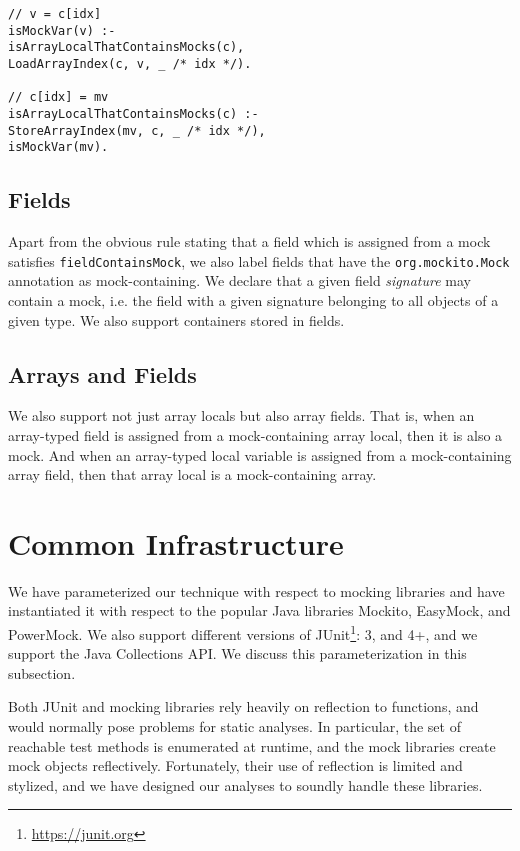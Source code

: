 \begin{lstlisting}[basicstyle=\ttfamily\small,numbers=none]
// v = c[idx]
isMockVar(v) :-
isArrayLocalThatContainsMocks(c),
LoadArrayIndex(c, v, _ /* idx */).

// c[idx] = mv
isArrayLocalThatContainsMocks(c) :-
StoreArrayIndex(mv, c, _ /* idx */),
isMockVar(mv).
\end{lstlisting}

\subsection{Fields} 

Apart from the obvious rule stating that a field which is assigned from a mock satisfies {\tt fieldContainsMock}, we also label fields that have the {\tt org.mockito.Mock} annotation as mock-containing. We declare that a given field \emph{signature} may contain a mock, i.e. the field with a given signature belonging to all objects of a given type. We also support containers stored in fields.

\subsection{Arrays and Fields} 

We also support not just array locals but also array fields. That is, when an array-typed field is assigned from a mock-containing array local, then it is also a mock. And when an array-typed local variable is assigned from a mock-containing array field, then that array local is a mock-containing array.

\section{Common Infrastructure}
\label{sec:common}
We have parameterized our technique with respect to mocking libraries and have instantiated it with respect to the popular Java libraries Mockito, EasyMock, and PowerMock. We also support different versions of JUnit\footnote{\url{https://junit.org}}: 3, and 4+, and we support the Java Collections API. We discuss this parameterization in this subsection.

Both JUnit and mocking libraries rely heavily on reflection to functions, and would normally pose problems for static analyses. In particular, the set of reachable test methods is enumerated at runtime, and the mock libraries create mock objects reflectively. Fortunately, their use of reflection is limited and stylized, and we have designed our analyses to soundly handle these libraries.

